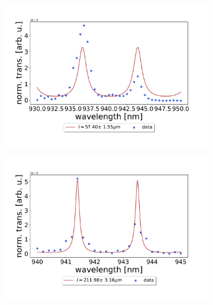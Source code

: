 \begin{figure}[h!]
    \centering
    \begin{subfigure}[b]{0.49\textwidth}
        \centering
        \includegraphics[width=\textwidth]{figures/60um_M5_FSR_fit.pdf}
        \caption{}
        \label{fig:short_single_fano_FSR}
    \end{subfigure}
    \begin{subfigure}[b]{0.49\textwidth}
        \centering
        \includegraphics[width=\textwidth]{figures/220um_M5_FSR_fit.pdf}
        \caption{}
        \label{fig:long_single_fano_FSR}
    \end{subfigure}
\end{figure}

